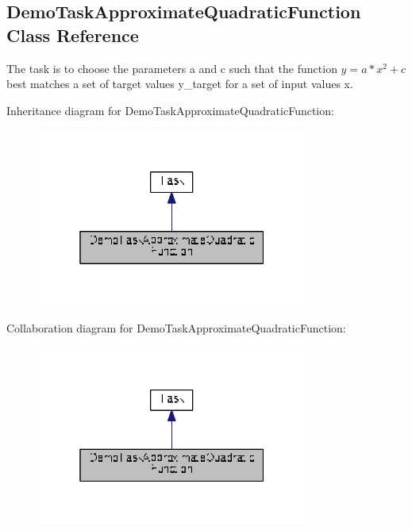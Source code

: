 \hypertarget{classDemoTaskApproximateQuadraticFunction}{\subsection{Demo\+Task\+Approximate\+Quadratic\+Function Class Reference}
\label{classDemoTaskApproximateQuadraticFunction}
}


The task is to choose the parameters a and c such that the function $ y = a*x^2 + c $ best matches a set of target values y\+\_\+target for a set of input values x.  




Inheritance diagram for Demo\+Task\+Approximate\+Quadratic\+Function\+:
\nopagebreak
\begin{figure}[H]
\begin{center}
\leavevmode
\includegraphics[width=253pt]{classDemoTaskApproximateQuadraticFunction__inherit__graph}
\end{center}
\end{figure}


Collaboration diagram for Demo\+Task\+Approximate\+Quadratic\+Function\+:
\nopagebreak
\begin{figure}[H]
\begin{center}
\leavevmode
\includegraphics[width=253pt]{classDemoTaskApproximateQuadraticFunction__coll__graph}
\end{center}
\end{figure}

